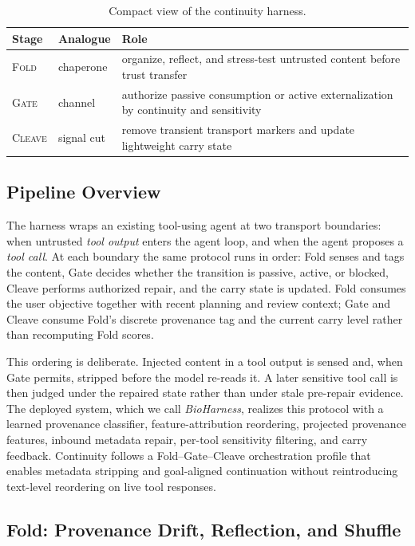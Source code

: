 \begin{table}[t]
\centering
\small
\setlength{\tabcolsep}{3pt}
\caption{Compact view of the continuity harness.}
\label{tab:compact-design}
\begin{tabular}{p{}p{}p{}}
\toprule
Stage & Analogue & Role \\
\midrule
\textsc{Fold} & chaperone & organize, reflect, and stress-test untrusted content before trust transfer \\
\textsc{Gate} & channel & authorize passive consumption or active externalization by continuity and sensitivity \\
\textsc{Cleave} & signal cut & remove transient transport markers and update lightweight carry state \\
\bottomrule
\end{tabular}
\end{table}

\subsection{Pipeline Overview}

The harness wraps an existing tool-using agent at two transport boundaries: when untrusted \emph{tool output} enters the agent loop, and when the agent proposes a \emph{tool call}. At each boundary the same protocol runs in order: Fold senses and tags the content, Gate decides whether the transition is passive, active, or blocked, Cleave performs authorized repair, and the carry state is updated. Fold consumes the user objective together with recent planning and review context; Gate and Cleave consume Fold's discrete provenance tag and the current carry level rather than recomputing Fold scores.

This ordering is deliberate. Injected content in a tool output is sensed and, when Gate permits, stripped before the model re-reads it. A later sensitive tool call is then judged under the repaired state rather than under stale pre-repair evidence. The deployed system, which we call \emph{BioHarness}, realizes this protocol with a learned provenance classifier, feature-attribution reordering, projected provenance features, inbound metadata repair, per-tool sensitivity filtering, and carry feedback. Continuity follows a Fold--Gate--Cleave orchestration profile that enables metadata stripping and goal-aligned continuation without reintroducing text-level reordering on live tool responses.

\subsection{Fold: Provenance Drift, Reflection, and Shuffle}

